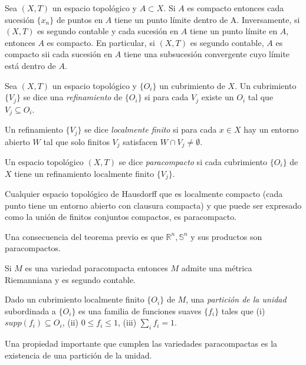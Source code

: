 \begin{theorem}\label{B-W}
Sea $(X,T)$ un espacio topológico y $A\subset X$. Si $A$ es compacto entonces cada sucesión $\{x_n\}$ de puntos en $A$ tiene un punto límite dentro de A. Inversamente, si $(X,T)$ es segundo contable y cada sucesión en $A$ tiene un punto límite en $A$, entonces $A$ es compacto. En particular, si $(X,T)$ es segundo contable, $A$ es compacto sii cada sucesión en $A$ tiene una subsucesión convergente cuyo límite está dentro de $A$. 
\end{theorem}

\begin{definition}
Sea $(X,T)$ un espacio topológico y $\{O_i\}$ un cubrimiento de $X$. Un cubrimiento $\{V_j\}$ se dice una \textit{refinamiento} de $\{O_i\}$ si para cada $V_j$ existe un $O_i$ tal que $V_j\subseteq O_i$.
\end{definition}


\begin{definition}
Un refinamiento $\{V_j\}$ se dice \textit{localmente finito} si para cada $x\in X$ hay un entorno abierto $W$ tal que solo finitos $V_j$ satisfacen $W\cap V_j\neq \emptyset$.
\end{definition}

\begin{definition}
Un espacio topológico $(X,T)$ se dice \textit{paracompacto} si cada cubrimiento $\{O_i\}$ de $X$ tiene un refinamiento localmente finito $\{V_j\}$. 
\end{definition}


\begin{theorem}
Cualquier espacio topológico de Hausdorff que es localmente compacto (cada punto tiene un entorno abierto con clausura compacta) y que puede ser expresado como la unión de finitos conjuntos compactos, es paracompacto. 
\end{theorem}

Una consecuencia del teorema previo es que $\mathbb{R}^n,\mathbb{S}^n$ y sus productos son paracompactos. 

\begin{theorem}
Si $M$ es una variedad paracompacta entonces $M$ admite una métrica Riemanniana y es segundo contable.
\end{theorem}

\begin{definition}
Dado un cubrimiento localmente finito $\{O_i\}$ de $M$, una \textit{partición de la unidad} subordinada a $\{O_i\}$ es una familia de funciones suaves $\{f_i\}$ tales que (i) $supp(f_i)\subseteq O_i$, (ii) $0\leq f_i \leq 1$, (iii) $\sum_i f_i=1$.
\end{definition}


Una propiedad importante que cumplen las variedades paracompactas es la existencia de una partición de la unidad.

